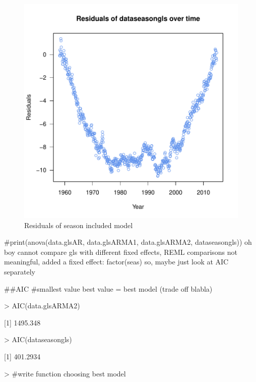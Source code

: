 \documentclass[11pt, a4paper]{article} %
\begin{document}
\begin{figure}[H]
\centering
\begin{Schunk}
\end{Schunk}
\includegraphics{alleselena-resseas}
\caption{Residuals of season included model}
\label{resseas}
\end{figure}

#print(anova(data.glsAR, data.glsARMA1, data.glsARMA2, dataseasongls))
oh boy cannot compare gls with different fixed effects, REML comparisons not meaningful, added a fixed effect: factor(seas)
so, maybe just look at AIC separately 

##AIC #smallest value best value = best model (trade off blabla)

\begin{Schunk}
\begin{Sinput}
> AIC(data.glsARMA2)
\end{Sinput}
[1] 1495.348\begin{Sinput}
> AIC(dataseasongls)
\end{Sinput}
[1] 401.2934\begin{Sinput}
> #write function choosing best model 
\end{Sinput}
\end{Schunk}
\end{document}

